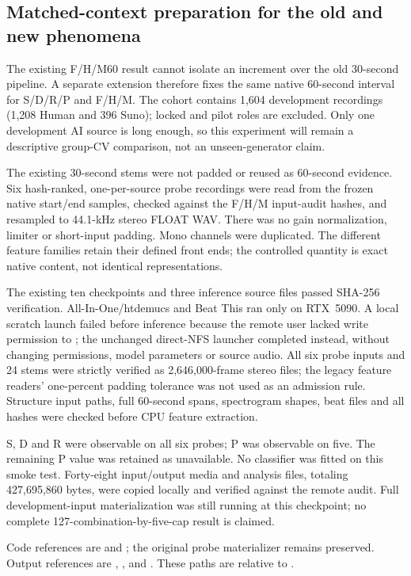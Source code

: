 \subsection{Matched-context preparation for the old and new phenomena}

The existing F/H/M60 result cannot isolate an increment over the old 30-second
pipeline. A separate extension therefore fixes the same native 60-second
interval for S/D/R/P and F/H/M. The cohort contains 1,604 development recordings
(1,208 Human and 396 Suno); locked and pilot roles are excluded. Only one
development AI source is long enough, so this experiment will remain a
descriptive group-CV comparison, not an unseen-generator claim.

The existing 30-second stems were not padded or reused as 60-second evidence.
Six hash-ranked, one-per-source probe recordings were read from the frozen
native start/end samples, checked against the F/H/M input-audit hashes, and
resampled to 44.1-kHz stereo FLOAT WAV. There was no gain normalization, limiter
or short-input padding. Mono channels were duplicated. The different feature
families retain their defined front ends; the controlled quantity is exact
native content, not identical representations.

The existing ten checkpoints and three inference source files passed SHA-256
verification. All-In-One/htdemucs and Beat This ran only on RTX~5090. A local
scratch launch failed before inference because the remote user lacked write
permission to ; the unchanged direct-NFS launcher completed instead,
without changing permissions, model parameters or source audio. All six probe
inputs and 24 stems were strictly verified as 2,646,000-frame stereo files;
the legacy feature readers' one-percent padding tolerance was not used as an
admission rule. Structure input paths, full 60-second spans, spectrogram shapes,
beat files and all hashes were checked before CPU feature extraction.

S, D and R were observable on all six probes; P was observable on five. The
remaining P value was retained as unavailable. No classifier was fitted on this
smoke test. Forty-eight input/output media and analysis files, totaling
427,695,860 bytes, were copied locally and verified against the remote audit.
Full development-input materialization was still running at this checkpoint;
no complete 127-combination-by-five-cap result is claimed.

Code references are  and
; the original probe materializer remains
preserved. Output references are ,
, and
. These paths are relative to
.
